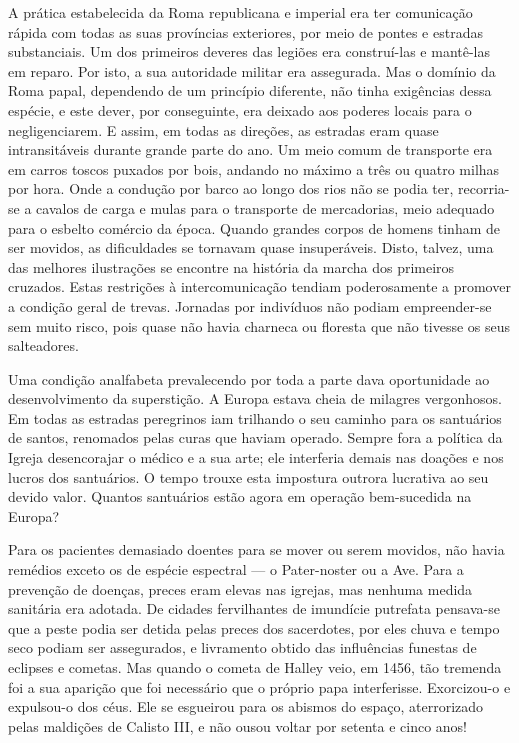 \documentclass[11pt,a5paper,twoside,openany]{book}
\begin{document}
A prática estabelecida da Roma republicana e imperial era ter comunicação rápida com todas as suas províncias exteriores, por meio de pontes e estradas substanciais. Um dos primeiros deveres das legiões era construí-las e mantê-las em reparo. Por isto, a sua autoridade militar era assegurada. Mas o domínio da Roma papal, dependendo de um princípio diferente, não tinha exigências dessa espécie, e este dever, por conseguinte, era deixado aos poderes locais para o negligenciarem. E assim, em todas as direções, as estradas eram quase intransitáveis durante grande parte do ano. Um meio comum de transporte era em carros toscos puxados por bois, andando no máximo a três ou quatro milhas por hora. Onde a condução por barco ao longo dos rios não se podia ter, recorria-se a cavalos de carga e mulas para o transporte de mercadorias, meio adequado para o esbelto comércio da época. Quando grandes corpos de homens tinham de ser movidos, as dificuldades se tornavam quase insuperáveis. Disto, talvez, uma das melhores ilustrações se encontre na história da marcha dos primeiros cruzados. Estas restrições à intercomunicação tendiam poderosamente a promover a condição geral de trevas. Jornadas por indivíduos não podiam empreender-se sem muito risco, pois quase não havia charneca ou floresta que não tivesse os seus salteadores.

Uma condição analfabeta prevalecendo por toda a parte dava oportunidade ao desenvolvimento da superstição. A Europa estava cheia de milagres vergonhosos. Em todas as estradas peregrinos iam trilhando o seu caminho para os santuários de santos, renomados pelas curas que haviam operado. Sempre fora a política da Igreja desencorajar o médico e a sua arte; ele interferia demais nas doações e nos lucros dos santuários. O tempo trouxe esta impostura outrora lucrativa ao seu devido valor. Quantos santuários estão agora em operação bem-sucedida na Europa?

Para os pacientes demasiado doentes para se mover ou serem movidos, não havia remédios exceto os de espécie espectral — o Pater-noster ou a Ave. Para a prevenção de doenças, preces eram elevas nas igrejas, mas nenhuma medida sanitária era adotada. De cidades fervilhantes de imundície putrefata pensava-se que a peste podia ser detida pelas preces dos sacerdotes, por eles chuva e tempo seco podiam ser assegurados, e livramento obtido das influências funestas de eclipses e cometas. Mas quando o cometa de Halley veio, em 1456, tão tremenda foi a sua aparição que foi necessário que o próprio papa interferisse. Exorcizou-o e expulsou-o dos céus. Ele se esgueirou para os abismos do espaço, aterrorizado pelas maldições de Calisto III, e não ousou voltar por setenta e cinco anos!
\end{document}
